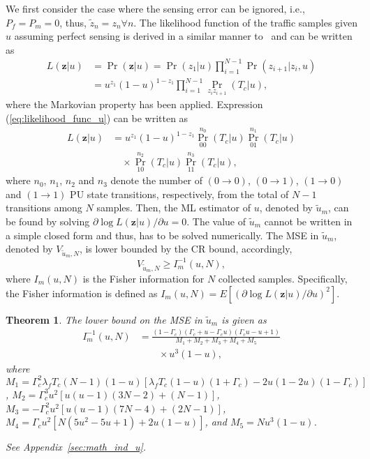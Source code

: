 \documentclass[11pt,draftclsnofoot,journal,onecolumn]{IEEEtran}
\newtheorem{theorem}{Theorem}
\begin{document}
We first consider the case where the sensing error can be ignored, i.e., $P_f = P_m = 0$, thus, $\tilde z_n = z_n \forall n$. The likelihood function of the traffic samples given $u$ assuming perfect sensing is derived in a similar manner to~\cite[Sec. 6.1]{kim_tmc_2008} and can be written as
\begin{align}
L(\boldsymbol{z}|u) & = \Pr(\boldsymbol{z}|u) = \Pr(z_1|u) \prod_{i=1}^{N-1} \Pr(z_{i+1} | z_i, u)\nonumber\\& = u^{z_1}\left(1-u\right)^{1-z_1} \prod_{i=1}^{N-1} \textstyle\Pr_{z_{i}z_{i+1}}(T_c|u),
\label{eq:likelihood_func_u}
\end{align}
where the Markovian property has been applied. Expression (\ref{eq:likelihood_func_u}) can be written as
\begin{align}
L(\boldsymbol{z}|u) & = u^{z_1}(1-u)^{1-z_1} \textstyle\Pr_{00}^{n_0}(T_c|u) \textstyle\Pr_{01}^{n_1}(T_c|u)\nonumber\\&\quad\times \textstyle\Pr_{10}^{n_2}(T_c|u) \textstyle\Pr_{11}^{n_3}(T_c|u),
\label{eq:likelihood_func_lambda_f2}
\end{align}
where $n_0$, $n_1$, $n_2$ and $n_3$ denote the number of $(0\!\rightarrow\!0)$, $(0\!\rightarrow\!1)$, $(1\!\rightarrow\!0)$ and $(1\!\rightarrow\!1)$ PU state transitions, respectively, from the total of $N-1$ transitions among $N$ samples. Then, the ML estimator of $u$, denoted by $\tilde{u}_m$, can be found by solving $\partial \log L(\boldsymbol{z}|u)/ \partial u = 0$. The value of $\tilde{u}_m$ cannot be written in a simple closed form and thus, has to be solved numerically. The MSE in $\tilde{u}_m$, denoted by $V_{\tilde{u}_m,N}$, is lower bounded by the CR bound, accordingly, 
\begin{equation}
V_{\tilde{u}_m,N} \geq I_m^{-1}\left(u,N\right),
\label{eq;u_cr1}
\end{equation}
where $I_m\left(u,N\right)$ is the Fisher information for $N$ collected samples. Specifically, the Fisher information is defined as $I_m(u,N) = E\left[\left(\partial\log L(\boldsymbol{z}|u)/\partial u\right)^2\right]$.
\begin{theorem}
The lower bound on the MSE in $\tilde{u}_m$ is given as
\begin{align}
I_m^{-1}\left(u,N\right) &= \frac{\left(1-\Gamma_c\right)\left(\Gamma_c+u-\Gamma_c u\right)\left(\Gamma_c u-u+1\right)}{M_1 + M_2 + M_3 + M_4 + M_5}\nonumber\\&\qquad\times u^3 \left(1-u\right),
\label{eq;nb_4_u}
\end{align}
where $M_1=\Gamma_c^2 \lambda_f T_c(N-1)(1-u)[\lambda_f T_c(1-u)(1+\Gamma_c )-2u(1-2u)(1-\Gamma_c )]$, $M_2=\Gamma_c^3 u^2 [u(u-1)(3N-2)+(N-1)]$, $M_3 = -\Gamma_c^2 u^2 [u(u-1)(7N-4)+(2N-1)]$, $M_4 = \Gamma_c u^2 [N(5u^2-5u+1)+2u(1-u)]$, and $M_5 = Nu^3 (1-u)$.

\begin{IEEEproof}
See Appendix~\ref{sec:math_ind_u}.
\end{IEEEproof}
\end{theorem}
\end{document}
